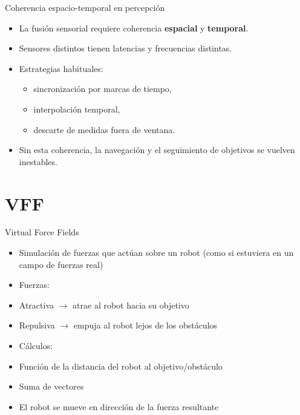 \documentclass[aspectratio=169]{beamer}
\begin{document}
\begin{frame}{Coherencia espacio-temporal en percepción}
  \small
  \begin{itemize}
    \item La fusión sensorial requiere coherencia \textbf{espacial} y \textbf{temporal}.
    \item Sensores distintos tienen latencias y frecuencias distintas.
    \item Estrategias habituales:
    \begin{itemize}
      \item sincronización por marcas de tiempo,
      \item interpolación temporal,
      \item descarte de medidas fuera de ventana.
    \end{itemize}
    \item Sin esta coherencia, la navegación y el seguimiento de objetivos se vuelven inestables.
  \end{itemize}
\end{frame}

\section{VFF}

\begin{frame}{Virtual Force Fields}
  \small
  \begin{itemize}
    \item Simulación de fuerzas que actúan sobre un robot (como si estuviera en un campo de fuerzas real)
    \item Fuerzas:
    \item Atractiva $\rightarrow$ atrae al robot hacia su objetivo
    \item Repulsiva $\rightarrow$ empuja al robot lejos de los obstáculos
    \item Cálculos:
    \item Función de la distancia del robot al objetivo/obstáculo
    \item Suma de vectores
    \item El robot se mueve en dirección de la fuerza resultante
  \end{itemize}
\end{frame}
\end{document}
